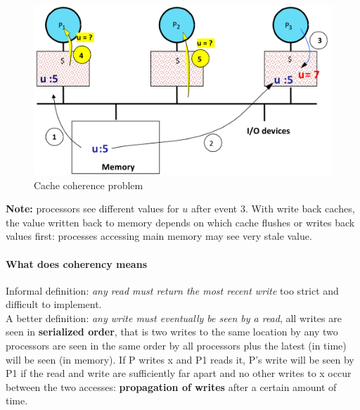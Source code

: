 \begin{figure}[h]
    \centering
    \includegraphics[scale = 0.4]{images/cache-coherence-problem}
    \caption{Cache coherence problem}
    \label{fig:cache-coherence-problem}
\end{figure}
\textbf{Note:} processors see different values for $u$ after event 3.
With write back caches, the value written back to memory depends on which cache flushes or writes back values first:
processes accessing main memory may see very stale value.

\paragraph{What does coherency means}
Informal definition: \textit{any read must return the most recent write} \textrightarrow too strict and difficult to
implement.\\
A better definition: \textit{any write must eventually be seen by a read}, all writes are seen in \textbf{serialized
order}, that is two writes to the same location by any two processors are seen in the same order by all processors
plus the latest (in time) will be seen (in memory).
If P writes x and P1 reads it, P’s write will be seen by P1 if the read
and write are sufficiently far apart and no other writes to x occur
between the two accesses: \textbf{propagation of writes} after a certain amount of time.

